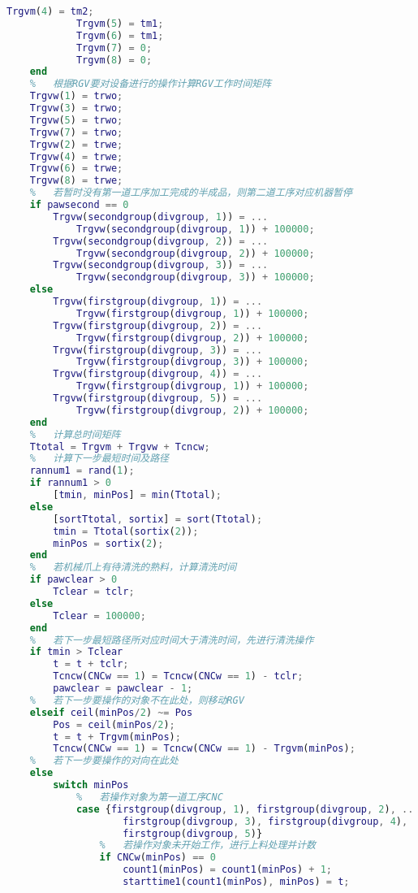\documentclass[no-math,withoutpreface,bwprint]{cumcmthesis} %
\numberwithin{equation}{section}
\numberwithin{figure}{section}
\numberwithin{table}{section}
\begin{document}
\begin{lstlisting}[language=matlab]
            Trgvm(4) = tm2;
            Trgvm(5) = tm1;
            Trgvm(6) = tm1;
            Trgvm(7) = 0;
            Trgvm(8) = 0;        
    end
    %   根据RGV要对设备进行的操作计算RGV工作时间矩阵
    Trgvw(1) = trwo;
    Trgvw(3) = trwo;
    Trgvw(5) = trwo;
    Trgvw(7) = trwo;
    Trgvw(2) = trwe;
    Trgvw(4) = trwe;
    Trgvw(6) = trwe;
    Trgvw(8) = trwe;
    %   若暂时没有第一道工序加工完成的半成品，则第二道工序对应机器暂停
    if pawsecond == 0
        Trgvw(secondgroup(divgroup, 1)) = ...
            Trgvw(secondgroup(divgroup, 1)) + 100000;
        Trgvw(secondgroup(divgroup, 2)) = ...
            Trgvw(secondgroup(divgroup, 2)) + 100000;
        Trgvw(secondgroup(divgroup, 3)) = ...
            Trgvw(secondgroup(divgroup, 3)) + 100000;
    else
        Trgvw(firstgroup(divgroup, 1)) = ...
            Trgvw(firstgroup(divgroup, 1)) + 100000;
        Trgvw(firstgroup(divgroup, 2)) = ...
            Trgvw(firstgroup(divgroup, 2)) + 100000;
        Trgvw(firstgroup(divgroup, 3)) = ...
            Trgvw(firstgroup(divgroup, 3)) + 100000;
        Trgvw(firstgroup(divgroup, 4)) = ...
            Trgvw(firstgroup(divgroup, 1)) + 100000;
        Trgvw(firstgroup(divgroup, 5)) = ...
            Trgvw(firstgroup(divgroup, 2)) + 100000;
    end
    %   计算总时间矩阵
    Ttotal = Trgvm + Trgvw + Tcncw;
    %   计算下一步最短时间及路径
    rannum1 = rand(1);
    if rannum1 > 0
        [tmin, minPos] = min(Ttotal);
    else
        [sortTtotal, sortix] = sort(Ttotal);
        tmin = Ttotal(sortix(2));
        minPos = sortix(2);
    end
    %   若机械爪上有待清洗的熟料，计算清洗时间
    if pawclear > 0
        Tclear = tclr;
    else
        Tclear = 100000;
    end
    %   若下一步最短路径所对应时间大于清洗时间，先进行清洗操作
    if tmin > Tclear
        t = t + tclr;
        Tcncw(CNCw == 1) = Tcncw(CNCw == 1) - tclr;
        pawclear = pawclear - 1;
    %   若下一步要操作的对象不在此处，则移动RGV
    elseif ceil(minPos/2) ~= Pos
        Pos = ceil(minPos/2);
        t = t + Trgvm(minPos);
        Tcncw(CNCw == 1) = Tcncw(CNCw == 1) - Trgvm(minPos);
    %   若下一步要操作的对向在此处
    else
        switch minPos
            %   若操作对象为第一道工序CNC
            case {firstgroup(divgroup, 1), firstgroup(divgroup, 2), ...
                    firstgroup(divgroup, 3), firstgroup(divgroup, 4), ...
                    firstgroup(divgroup, 5)}
                %   若操作对象未开始工作，进行上料处理并计数
                if CNCw(minPos) == 0
                    count1(minPos) = count1(minPos) + 1;
                    starttime1(count1(minPos), minPos) = t;

\end{lstlisting}
\end{document}
